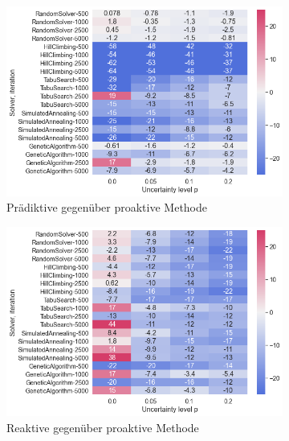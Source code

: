 \begin{figure}[H]

    \begin{subfigure}{0.497\linewidth}
        \centering
        \includegraphics[width=\linewidth]{assets/img/05_Evaluation/heatmap_n0_1.png}
        \caption{Prädiktive gegenüber proaktive Methode}
        \label{fig:evaluation_solver_n0_heatmap_1}
    \end{subfigure}
    \hfill
    \begin{subfigure}{0.497\linewidth}
        \centering
        \includegraphics[width=\linewidth]{assets/img/05_Evaluation/heatmap_n0_2.png}
        \caption{Reaktive gegenüber proaktive Methode}
        \label{fig:evaluation_solver_n0_heatmap_2}
    \end{subfigure}
    \par\bigskip 
    \begin{subfigure}{1\linewidth}

\end{subfigure}
\end{figure}
